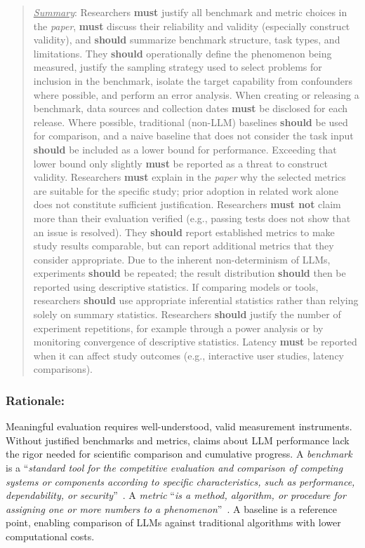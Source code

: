 \documentclass[smallextended]{svjour3}
\newcommand*{\enq}[1]{\enquote{{\itshape#1}}}
\newcommand{\must}{\textbf{must}\xspace}
\newcommand{\mustnot}{\textbf{must not}\xspace}
\newcommand{\should}{\textbf{should}\xspace}
\newcommand{\summary}{\underline{\emph{Summary}}\xspace}
\newcommand{\summary}{\textbf{\emph{Summary}}\xspace}
\newcommand{\paper}{\emph{paper}\xspace}
\newcommand{\paper}{\emph{paper}\xspace}
\newenvironment{framed}{\begin{quote}}{\end{quote}}
\newcommand{\guidelinesubsubsection}[1]{\subsubsection{\bfseries #1:}}
\newcommand{\guidelinesubsubsection}[1]{\subsubsection{#1}}
\begin{document}
\vspace{0.5\baselineskip}
\begin{framed}
\summary: %
Researchers \must justify all benchmark and metric choices in the \paper, \must discuss their reliability and validity (especially construct validity), and \should summarize benchmark structure, task types, and limitations. They \should operationally define the phenomenon being measured, justify the sampling strategy used to select problems for inclusion in the benchmark, isolate the target capability from confounders where possible, and perform an error analysis. When creating or releasing a benchmark, data sources and collection dates \must be disclosed for each release. Where possible, traditional (non-LLM) baselines \should be used for comparison, and a naive baseline that does not consider the task input \should be included as a lower bound for performance. Exceeding that lower bound only slightly \must be reported as a threat to construct validity. Researchers \must explain in the \paper why the selected metrics are suitable for the specific study; prior adoption in related work alone does not constitute sufficient justification. Researchers \mustnot claim more than their evaluation verified (e.g., passing tests does not show that an issue is resolved). They \should report established metrics to make study results comparable, but can report additional metrics that they consider appropriate. Due to the inherent non-determinism of LLMs, experiments \should be repeated; the result distribution \should then be reported using descriptive statistics. If comparing models or tools, researchers \should use appropriate inferential statistics rather than relying solely on summary statistics. Researchers \should justify the number of experiment repetitions, for example through a power analysis or by monitoring convergence of descriptive statistics. Latency \must be reported when it can affect study outcomes (e.g., interactive user studies, latency comparisons).
\end{framed}

\guidelinesubsubsection{Rationale}

Meaningful evaluation requires well-understood, valid measurement instruments.
Without justified benchmarks and metrics, claims about LLM performance lack the rigor needed for scientific comparison and cumulative progress.
A \textit{benchmark} is a \enq{standard tool for the competitive evaluation and comparison of competing systems or components according to specific characteristics, such as performance, dependability, or security}~\cite{DBLP:conf/wosp/KistowskiAHLHC15}. A \textit{metric} \enq{is a method, algorithm, or procedure for assigning one or more numbers to a phenomenon}~\cite{DBLP:books/sp/24/RalphKAA24}. A baseline is a reference point, enabling comparison of LLMs against traditional algorithms with lower computational costs.
\end{document}
